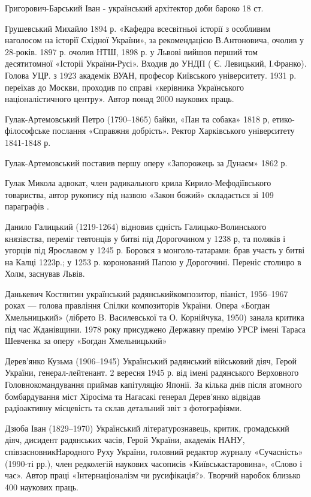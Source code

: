 Григорович-Барський Іван - український архітектор доби бароко 18 ст.

Грушевський Михайло 1894 р. «Кафедра всесвітньої історії з особливим наголосом на історії Східної України», за рекомендацією В.Антоновича, очолив у 28-років. 1897 р. очолив НТШ, 1898 р. у Львові вийшов перший том десятитомної «Історії України-Русі». Входив до УНДП ( Є. Левицький, І.Франко). Голова УЦР. з 1923 академік ВУАН, професор Київського університету. 1931 р. переїхав до Москви, проходив по справі «керівника Українського націоналістичного центру». Автор понад 2000 наукових праць. 

Гулак-Артемовський Петро (1790–1865) байки, «Пан та собака» 1818 р, етико-філософське послання «Справжня добрість». Ректор Харківського університету 1841-1848 р.

Гулак-Артемовський поставив першу оперу «Запорожець за Дунаєм»  1862 р.

Гулак Микола адвокат, член радикального крила Кирило-Мефодіївського товариства, автор рукопису під назвою «3акон божий» складається зі 109 параграфів .

Данило Галицький (1219-1264) відновив єдність Галицько-Волинського князівства, переміг тевтонців у битві під Дорогочином у 1238 р, та поляків і угорців під Ярославом у 1245 р. Боровся з монголо-татарами: брав участь у битві на Калці 1223р.; у 1253 р. коронований Папою у Дорогочині. Переніс столицю в Холм, заснував Львів.

Данькевич Костянтин український радянськийкомпозитор, піаніст, 1956–1967 роках — голова правління Спілки композиторів України. Опера «Богдан Хмельницький» (лібрето B. Василевської та О. Корнійчука, 1950) занала критика під час Жданівщини. 1978 року присуджено Державну премію УРСР імені Тараса Шевченка за оперу «Богдан Хмельницький»  

Дерев’янко Кузьма  (1906–1945) Український радянський військовий діяч, Герой України, генерал-лейтенант. 2 вересня 1945 р. від імені радянського Верховного Головнокомандування приймав капітуляцію Японії. За кілька днів після атомного бомбардування міст Хіросіма та Нагасакі генерал Дерев’янко відвідав радіоактивну місцевість та склав детальний звіт з фотографіями.

Дзюба Іван (1829–1970) Український літературознавець, критик, громадський діяч, дисидент радянських часів, Герой України, академік НАНУ, співзасновникНародного Руху України, головний редактор журналу «Сучасність» (1990-ті рр.), член редколегій наукових часописів «Київськастаровина», «Слово і час». Автор праці «Інтернаціоналізм чи русифікація?». Творчий наробок близько 400 наукових праць.

